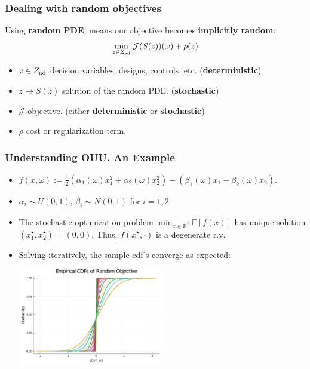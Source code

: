 \documentclass[aspectratio=169,xcolor=dvipsnames,10pt]{beamer}
\begin{document}
\begin{frame}\frametitle{Dealing with random objectives}
\begin{exampleblock}{}
Using \textbf{random PDE}, means our objective becomes \textbf{implicitly random}:
\[
\min_{z \in Z_{\rm ad}} \mathcal{J}(S(z))(\omega) + \rho(z)
\]
\begin{itemize}
\item $z \in Z_{\rm ad}$ decision variables, designs, controls, etc. (\textbf{deterministic})
\item $z \mapsto S(z)$ solution of the random PDE.  (\textbf{stochastic})
\item $\mathcal{J}$ objective. (either \textbf{deterministic} or \textbf{stochastic})
\item $\rho$ cost or regularization term.
\end{itemize}
\end{exampleblock}
\end{frame}

\begin{frame}\frametitle{Understanding OUU. An Example}
\begin{example}{}
\begin{itemize}
\item $f(x,\omega) := \frac{1}{2}(\alpha_1(\omega) x_1^2 + \alpha_2(\omega) x_2^2) - (\beta_1(\omega) x_1 + \beta_2(\omega) x_2).$
\item $\alpha_i \sim U(0,1)$, $\beta_i \sim N(0,1)$ for $i=1,2$.
\item The stochastic optimization problem 
$
\min_{x \in \mathbb R^2 } \mathbb E[f(x)]
$
has unique solution $(x^{\star}_1,x^{\star}_2) = (0,0)$. Thus, $f(x^{\star},\cdot)$ is a degenerate r.v.
\item Solving iteratively, the sample cdf's converge as expected:
\begin{center}
\includegraphics[width=0.5\textwidth, keepaspectratio]{Part I/figures/empirical_cdfs_obj.pdf}
\end{center}
\end{itemize}
\end{example}
\end{frame}
\end{document}
